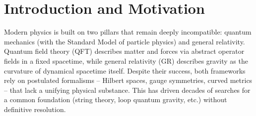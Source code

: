 \documentclass[a4paper,12pt]{article}
\begin{document}
\section{Introduction and Motivation}
    Modern physics is built on two pillars that remain deeply incompatible: quantum mechanics (with the Standard Model of particle physics) and general relativity. Quantum field theory (QFT) describes matter and forces via abstract operator fields in a fixed spacetime, while general relativity (GR) describes gravity as the curvature of dynamical spacetime itself. Despite their success, both frameworks rely on postulated formalisms -- Hilbert spaces, gauge symmetries, curved metrics -- that lack a unifying physical substance. This has driven decades of searches for a common foundation (string theory, loop quantum gravity, etc.) without definitive resolution.
\end{document}
